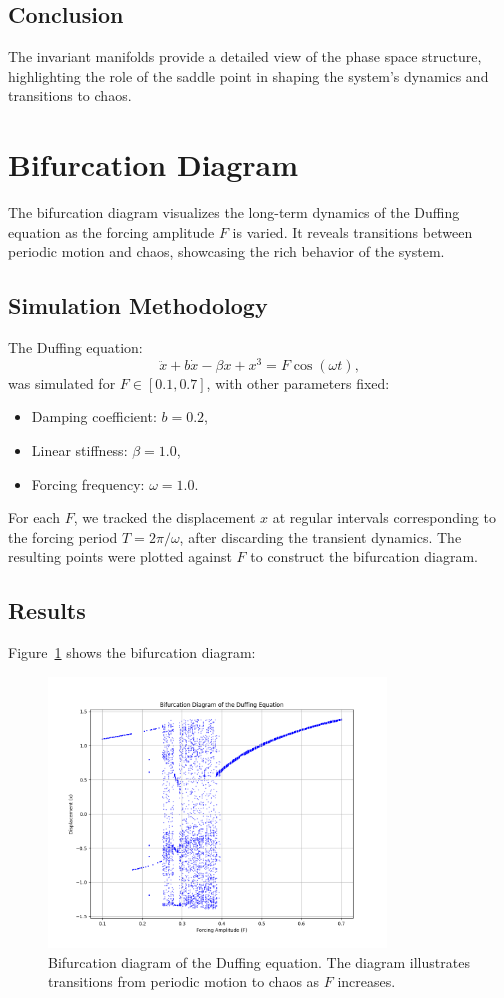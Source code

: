 \documentclass[11pt]{article}
\begin{document}
\subsection*{Conclusion}
The invariant manifolds provide a detailed view of the phase space structure, highlighting the role of the saddle point in shaping the system's dynamics and transitions to chaos.

\section*{Bifurcation Diagram}
The bifurcation diagram visualizes the long-term dynamics of the Duffing equation as the forcing amplitude \(F\) is varied. It reveals transitions between periodic motion and chaos, showcasing the rich behavior of the system.

\subsection*{Simulation Methodology}
The Duffing equation:
\[
\ddot{x} + b \dot{x} - \beta x + x^3 = F \cos(\omega t),
\]
was simulated for \(F \in [0.1, 0.7]\), with other parameters fixed:
\begin{itemize}
    \item Damping coefficient: \(b = 0.2\),
    \item Linear stiffness: \(\beta = 1.0\),
    \item Forcing frequency: \(\omega = 1.0\).
\end{itemize}

For each \(F\), we tracked the displacement \(x\) at regular intervals corresponding to the forcing period \(T = 2\pi/\omega\), after discarding the transient dynamics. The resulting points were plotted against \(F\) to construct the bifurcation diagram.

\subsection*{Results}
Figure~\ref{fig:bifurcation_diagram} shows the bifurcation diagram:
\begin{figure}[h!]
    \centering
    \includegraphics[width=0.8\textwidth]{bifurcation_diagram.png}
    \caption{Bifurcation diagram of the Duffing equation. The diagram illustrates transitions from periodic motion to chaos as \(F\) increases.}
    \label{fig:bifurcation_diagram}
\end{figure}
\end{document}
